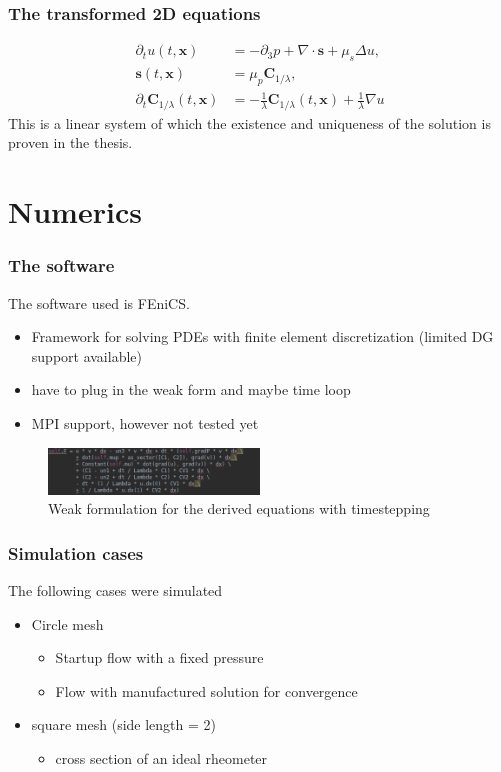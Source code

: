 \documentclass[12pt,a4paper,handout]{beamer}
\theoremstyle{definition}
\theoremstyle{plain}
\newcommand{\bfs}{\bm{s}}
\newcommand{\bfC}{\bm{C}}
\newcommand{\bfx}{\bm{x}}
\begin{document}
\begin{frame}
    \frametitle{The transformed 2D equations}
    \begin{align*}
        \partial_t u(t,\bfx) &= -\partial_3 p +\nabla\cdot \bfs+\mu_s\Delta u,\\
        \label{eq:transfeq2}
        \bfs(t,\bfx)&=\mu_p\bfC_{1/\lambda},\\
        \partial_t\bfC_{1/\lambda}(t,\bfx) &= -\frac{1}{\lambda}\bfC_{1/\lambda}(t,\bfx)+\frac{1}{\lambda}\nabla u    \end{align*}
        This is a linear system of which the existence and uniqueness of the solution is proven in the thesis.
\end{frame}
\section{Numerics}
\begin{frame}
    \frametitle{The software}
    The software used is FEniCS. 
    \begin{itemize}[<+->]
        \item Framework for solving PDEs with finite element discretization (limited DG support available)
        \item have to plug in the weak form and maybe time loop
        \item MPI support, however not tested yet 
    \end{itemize}
    \begin{figure}
        \includegraphics[width=0.5\textwidth]{FenicsCode}
        \caption{Weak formulation for the derived equations with timestepping}
    \end{figure}
\end{frame}
\begin{frame}
\frametitle{Simulation cases}
The following cases were simulated
\begin{itemize}[<+->]
    \item Circle mesh 
    \begin{itemize}[<+->]
        \item Startup flow with a fixed pressure 
        \item Flow with manufactured solution for convergence
    \end{itemize}
    \item square mesh (side length = 2)
    \begin{itemize}[<+->]
        \item cross section of an ideal rheometer
    \end{itemize}
\end{itemize}
\end{frame}
\end{document}
